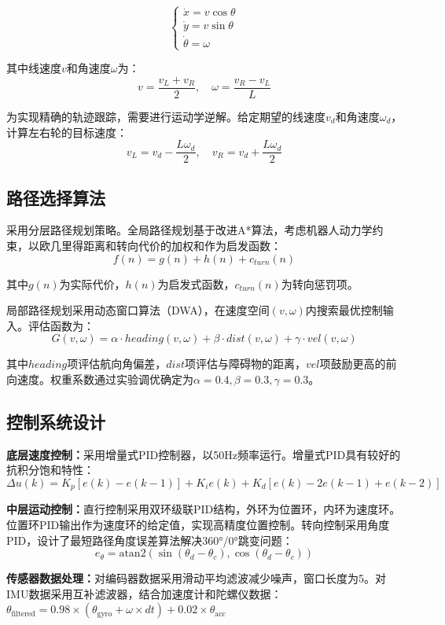 \documentclass[UTF8]{ctexart}
\begin{document}
	$$\begin{cases}
		\dot{x} = v \cos\theta \\
		\dot{y} = v \sin\theta \\
		\dot{\theta} = \omega
	\end{cases}$$
	
	其中线速度$v$和角速度$\omega$为：
	$$v = \frac{v_L + v_R}{2}, \quad \omega = \frac{v_R - v_L}{L}$$
	
	为实现精确的轨迹跟踪，需要进行运动学逆解。给定期望的线速度$v_d$和角速度$\omega_d$，计算左右轮的目标速度：
	$$v_L = v_d - \frac{L \omega_d}{2}, \quad v_R = v_d + \frac{L \omega_d}{2}$$
	
	\subsection{路径选择算法}
	采用分层路径规划策略。全局路径规划基于改进A*算法，考虑机器人动力学约束，以欧几里得距离和转向代价的加权和作为启发函数：
	$$f(n) = g(n) + h(n) + c_{turn}(n)$$
	
	其中$g(n)$为实际代价，$h(n)$为启发式函数，$c_{turn}(n)$为转向惩罚项。
	
	局部路径规划采用动态窗口算法（DWA），在速度空间$(v, \omega)$内搜索最优控制输入。评估函数为：
	$$G(v,\omega) = \alpha \cdot heading(v,\omega) + \beta \cdot dist(v,\omega) + \gamma \cdot vel(v,\omega)$$
	
	其中$heading$项评估航向角偏差，$dist$项评估与障碍物的距离，$vel$项鼓励更高的前向速度。权重系数通过实验调优确定为$\alpha=0.4, \beta=0.3, \gamma=0.3$。
	
	\subsection{控制系统设计}
	\textbf{底层速度控制：}采用增量式PID控制器，以50Hz频率运行。增量式PID具有较好的抗积分饱和特性：
	$$\Delta u(k) = K_p[e(k) - e(k-1)] + K_i e(k) + K_d[e(k) - 2e(k-1) + e(k-2)]$$
	
	\textbf{中层运动控制：}直行控制采用双环级联PID结构，外环为位置环，内环为速度环。位置环PID输出作为速度环的给定值，实现高精度位置控制。转向控制采用角度PID，设计了最短路径角度误差算法解决360°/0°跳变问题：
	$$e_{\theta} = \text{atan2}(\sin(\theta_d - \theta_c), \cos(\theta_d - \theta_c))$$
	
	\textbf{传感器数据处理：}对编码器数据采用滑动平均滤波减少噪声，窗口长度为5。对IMU数据采用互补滤波器，结合加速度计和陀螺仪数据：
	$\theta_{\text{filtered}} = 0.98 \times (\theta_{\text{gyro}} + \omega \times dt) + 0.02 \times \theta_{\text{acc}}$
	
\end{document}
